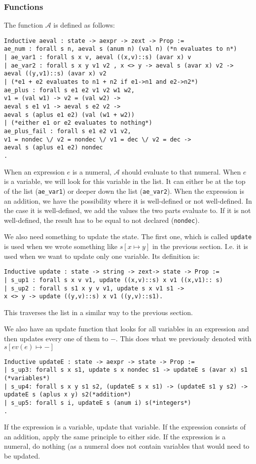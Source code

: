 \subsubsection{Functions}
The function $\mathcal{A}$ is defined as follows:
\begin{verbatim}
Inductive aeval : state -> aexpr -> zext -> Prop :=
ae_num : forall s n, aeval s (anum n) (val n) (*n evaluates to n*)
| ae_var1 : forall s x v, aeval ((x,v)::s) (avar x) v
| ae_var2 : forall s x y v1 v2 , x <> y -> aeval s (avar x) v2 ->
aeval ((y,v1)::s) (avar x) v2
| (*e1 + e2 evaluates to n1 + n2 if e1->n1 and e2->n2*) 
ae_plus : forall s e1 e2 v1 v2 w1 w2, 
v1 = (val w1) -> v2 = (val w2) ->
aeval s e1 v1 -> aeval s e2 v2 ->
aeval s (aplus e1 e2) (val (w1 + w2))
| (*either e1 or e2 evaluates to nothing*) 
ae_plus_fail : forall s e1 e2 v1 v2, 
v1 = nondec \/ v2 = nondec \/ v1 = dec \/ v2 = dec ->
aeval s (aplus e1 e2) nondec
.
\end{verbatim}
When an expression $e$ is a numeral, $\mathcal{A}$ should evaluate to that numeral. When $e$ is a variable, we will look for this variable in the list. It can either be at the top of the list (\verb|ae_var1|) or deeper down the list (\verb|ae_var2|). When the expression is an addition, we have the possibility where it is well-defined or not well-defined. In the case it is well-defined, we add the values the two parts evaluate to. If it is not well-defined, the result has to be equal to not declared (\verb|nondec|). 


We also need something to update the state. The first one, which is called \verb|update| is used when we wrote something like $s[x \mapsto y]$ in the previous section. I.e. it is used when we want to update only one variable. Its definition is:

\begin{verbatim}
Inductive update : state -> string -> zext-> state -> Prop :=
| s_up1 : forall s x v v1, update ((x,v)::s) x v1 ((x,v1):: s)
| s_up2 : forall s s1 x y v v1, update s x v1 s1 ->
x <> y -> update ((y,v)::s) x v1 ((y,v)::s1).
\end{verbatim}
This traverses the list in a similar way to the previous section. 

We also have an update function that looks for all variables in an expression and then updates every one of them to $-$. This does what we previously denoted with $s[ev(e)\mapsto-]$

\begin{verbatim}
Inductive updateE : state -> aexpr -> state -> Prop :=
| s_up3: forall s x s1, update s x nondec s1 -> updateE s (avar x) s1 (*variables*)
| s_up4: forall s x y s1 s2, (updateE s x s1) -> (updateE s1 y s2) -> 
updateE s (aplus x y) s2(*addition*)
| s_up5: forall s i, updateE s (anum i) s(*integers*)
.
\end{verbatim}
If the expression is a variable, update that variable. If the expression consists of an addition, apply the same principle to either side. If the expression is a numeral, do nothing (as a numeral does not contain variables that would need to be updated. 

